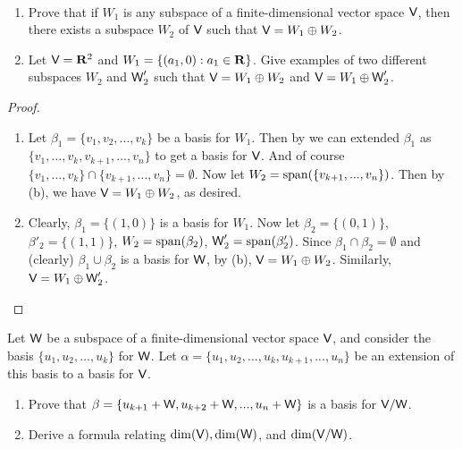 \begin{exercise} \label{exercise 1.6.34}\ 

\begin{enumerate}
\item Prove that if \(W_1\) is any subspace of a finite-dimensional vector space \(\textsf{V}\), then there exists a subspace \(W_2\) of \(\textsf{V}\) such that \(\textsf{V} = W_1 \oplus W_2\).
\item Let \(\textsf{V} = \mathbf{R}^2\) and \(W_1 = \{ (a_1, 0) : a_1 \in \mathbf{R} \}\).
    Give examples of two different subspaces \(W_2\) and \(\textsf{W}'_2\) such that \(\textsf{V} = W_1 \oplus W_2\) and \(\textsf{V} = W_1 \oplus \textsf{W}'_2\).
\end{enumerate}
\end{exercise}

\begin{proof} \ 
\begin{enumerate}
\item Let \(\beta_1 = \{ v_1, v_2, ..., v_k \}\) be a basis for \(W_1\).
    Then by \CORO{1.11.1} we can extended \(\beta_1\) as \(\{v_1, ..., v_k, v_{k + 1}, ..., v_n \}\) to get a basis for \(\textsf{V}\).
    And of course \(\{ v_1, ..., v_k \} \cap \{ v_{k + 1}, ..., v_n \} = \emptyset\).
    Now let \(W_2 = \operatorname{span}(\{ v_{k + 1}, ..., v_n \})\).
    Then by (b), we have \(\textsf{V} = W_1 \oplus W_2\), as desired.
\item Clearly, \(\beta_1 = \{ (1, 0) \}\) is a basis for \(W_1\).
    Now let \(\beta_2 = \{ (0, 1) \}\), \(\beta'_2 = \{ (1, 1) \}\), \(W_2 = \operatorname{span}(\beta_2)\), \(\textsf{W}'_2 = \operatorname{span}(\beta'_2)\).
    Since \(\beta_1 \cap \beta_2 = \emptyset\) and (clearly) \(\beta_1 \cup \beta_2\) is a basis for \(\textsf{W}\), by \EXEC{1.6.33}(b), \(\textsf{V} = W_1 \oplus W_2\).
    Similarly, \(\textsf{V} = W_1 \oplus \textsf{W}'_2\).
\end{enumerate}
\end{proof}

\begin{exercise} \label{exercise 1.6.35}
Let \(\textsf{W}\) be a subspace of a finite-dimensional vector space \(\textsf{V}\), and consider the basis \(\{ u_1, u_2, ..., u_k \}\) for \(\textsf{W}\).
Let \(\alpha = \{ u_1, u_2, ..., u_k, u_{k + 1}, ..., u_n \}\) be an extension of this basis to a basis for \(\textsf{V}\).
\begin{enumerate}
\item Prove that \(\beta = \{ u_{k + 1} + \textsf{W}, u_{k + 2} + \textsf{W}, ..., u_n + \textsf{W} \}\) is a basis for \(\textsf{V} / \textsf{W}\).
\item Derive a formula relating \(\dim(\textsf{V}), \dim(\textsf{W})\), and \(\dim(\textsf{V}/\textsf{W})\).
\end{enumerate}
\end{exercise}

